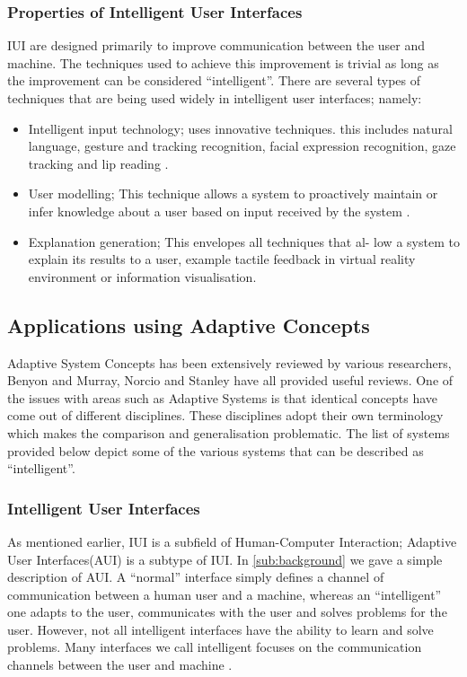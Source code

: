 \subsubsection{Properties of Intelligent User Interfaces}
IUI are designed primarily to improve communication between the user and machine. The techniques used to achieve this improvement is trivial as long as the improvement can be considered ``intelligent''.
There are several types of techniques that are being used widely in intelligent user interfaces; namely:
\begin{itemize}
\item Intelligent input technology; uses innovative techniques. this includes natural language, gesture and tracking recognition, facial expression recognition, gaze tracking and lip reading \cite{patrick2003intelligent}.
\item User modelling; This technique allows a system to proactively maintain or infer knowledge about a user based on input received by the system \cite{langley1997machine}.
\item Explanation generation; This envelopes all techniques that al- low a system to explain its results to a user, example tactile feedback in virtual reality environment or information visualisation.
\end{itemize}
\subsection{Applications using Adaptive Concepts}
Adaptive System Concepts has been extensively reviewed by various researchers, Benyon and Murray\cite{benyon1993applying}, Norcio and Stanley\cite{norcio1989adaptive} have all provided useful reviews. One of the issues with areas such as Adaptive Systems is that identical concepts have come out of different disciplines. These disciplines adopt their own terminology which makes the comparison and generalisation problematic. The list of systems provided below depict some of the various systems that can be described as ``intelligent''.
\subsubsection{Intelligent User Interfaces}
As mentioned earlier, IUI is a subfield of Human-Computer Interaction; Adaptive User Interfaces(AUI) is a subtype of IUI. In \ref{sub:background} we gave a simple description of AUI. A ``normal'' interface simply defines a channel of communication between a human user and a machine, whereas an ``intelligent'' one adapts to the user, communicates with the user and solves problems for the user.
However, not all intelligent interfaces have the ability to learn and solve problems. Many interfaces we call intelligent focuses on the communication channels between the user and machine \cite{patrick2003intelligent}.
